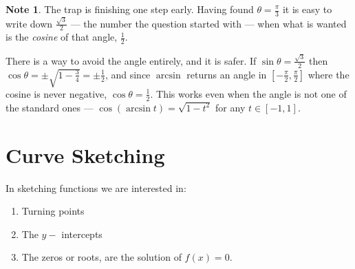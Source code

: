 \documentclass[11pt,a4paper]{article}
\theoremstyle{definition}
\newtheorem{note}[thm]{Note}
\begin{document}
\begin{note}
The trap is finishing one step early. Having found $\theta=\frac{\pi}{3}$ it is easy
to write down $\frac{\sqrt{3}}{2}$ --- the number the question started with --- when
what is wanted is the \emph{cosine} of that angle, $\frac{1}{2}$.

There is a way to avoid the angle entirely, and it is safer. If
$\sin\theta=\frac{\sqrt{3}}{2}$ then
$\cos\theta=\pm\sqrt{1-\frac{3}{4}}=\pm\frac{1}{2}$, and since $\arcsin$ returns an
angle in $\left[-\frac{\pi}{2},\frac{\pi}{2}\right]$ where the cosine is never
negative, $\cos\theta=\frac{1}{2}$. This works even when the angle is not one of the
standard ones --- $\cos\left(\arcsin t\right)=\sqrt{1-t^{2}}$ for any
$t\in[-1,1]$.
\end{note}

\pagebreak
\section{Curve Sketching}
In sketching functions we are interested in:
\begin{enumerate}
\item Turning points
\item The $y-$ intercepts
\item The zeros or roots, are the solution of $f(x)=0$.\\
\end{enumerate}
\end{document}
